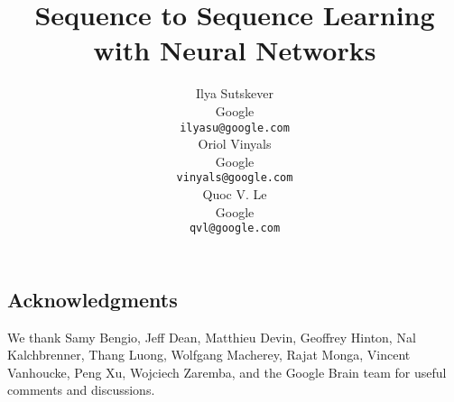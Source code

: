 \documentclass{article} %
\title{Sequence to Sequence Learning\\with Neural Networks}
\author{
Ilya Sutskever \\
Google\\
\texttt{ilyasu@google.com} \\
\And
Oriol Vinyals \\
Google\\
\texttt{vinyals@google.com} \\
\And
Quoc V. Le \\
Google\\
\texttt{qvl@google.com} \\
}
\begin{document}
\begin{CJK*}{UTF8}{gbsn}

\maketitle















\small
\section{Acknowledgments}

We thank Samy Bengio, Jeff Dean, Matthieu Devin, Geoffrey Hinton, Nal Kalchbrenner, Thang Luong, Wolfgang
Macherey, Rajat Monga, Vincent Vanhoucke, Peng Xu, Wojciech Zaremba,
and the Google Brain team for useful comments and discussions.


 

\end{CJK*}
\end{document}
